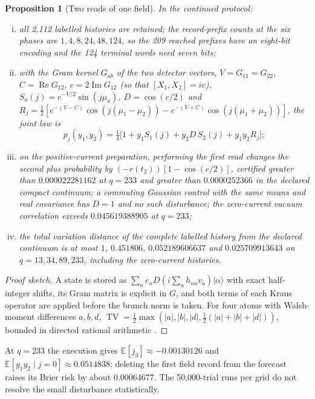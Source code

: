 \documentclass[11pt]{article}
\newtheorem{proposition}[theorem]{Proposition}
\theoremstyle{definition}
\theoremstyle{remark}
\theoremstyle{plain}
\newcommand{\ket}[1]{\lvert #1\rangle}
\newcommand{\Ex}{\mathbb{E}}
\newcommand{\TV}{\operatorname{TV}}
\begin{document}
\begin{proposition}[Two reads of one field]
\label{prop:two-read}
In the continued protocol:
\begin{enumerate}[(i)]
\item all 2,112 labelled histories are retained; the record-prefix counts at
the six phases are $1,4,8,24,48,124$, so the 209 reached prefixes have an
eight-bit encoding and the 124 terminal words need seven bits;
\item with the Gram kernel $G_{ab}$ of the two detector vectors,
$V=G_{11}=G_{22}$, $C=\operatorname{Re}G_{12}$, $c=2\operatorname{Im}G_{12}$
(so that $[X_1,X_2]=ic$), $S_a(j)=e^{-V/2}\sin(j\mu_a)$, $D=\cos(c/2)$ and
$R_j=\frac12[e^{-(V-C)}\cos(j(\mu_1-\mu_2))-e^{-(V+C)}\cos(j(\mu_1+\mu_2))]$,
the joint law is
\[
p_j(y_1,y_2)=\tfrac14\bigl[1+y_1S_1(j)+y_2D\,S_2(j)+y_1y_2R_j\bigr];
\]
\item on the positive-current preparation, performing the first read changes
the second plus probability by $(-r(t_2))[1-\cos(c/2)]$, certified greater
than $0.000022281162$ at $q=233$ and greater than $0.0000252366$ in the
declared compact continuum; a commuting Gaussian control with the same means
and real covariance has $D=1$ and no such disturbance; the zero-current
vacuum correlation exceeds $0.045619388905$ at $q=233$;
\item the total variation distance of the complete labelled history from the
declared continuum is at most $1$, $0.451806$, $0.052189606637$ and
$0.025709913643$ on $q=13,34,89,233$, including the zero-current histories.
\end{enumerate}
\end{proposition}

\begin{proof}[Proof sketch]
A state is stored as $\sum_nc_nD(i\sum_ah_{na}v_a)\ket\alpha$ with exact
half-integer shifts, its Gram matrix is explicit in $G$, and both terms of
each Kraus operator are applied before the branch norm is taken. For four
atoms with Walsh-moment differences $a,b,d$,
$\TV=\frac12\max(\lvert a\rvert,\lvert b\rvert,\lvert d\rvert,
\frac12(\lvert a\rvert+\lvert b\rvert+\lvert d\rvert))$, bounded in directed
rational arithmetic \cite{sCONT}.
\end{proof}

At $q=233$ the execution gives $\Ex[j_3]\approx-0.00130126$ and
$\Ex[y_1y_2\mid j=0]\approx0.0514838$; deleting the first field record from
the forecast raises its Brier risk by about $0.00064677$. The 50,000-trial
runs per grid do not resolve the small disturbance statistically.
\end{document}
